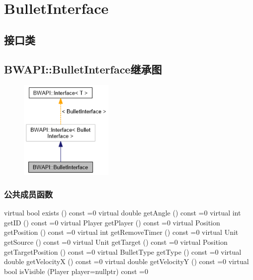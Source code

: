 \tableofcontents
\section{BulletInterface}
\subsection{接口类}
\subsection{BWAPI::BulletInterface继承图}
\begin{figure}[H]
    \centering
    \includegraphics[width=0.4\textwidth]{figures/BulletInterface继承图.png}
\end{figure}
\subsubsection{公共成员函数}
\begin{codebox}[公共成员函数]
virtual bool exists () const =0
virtual double getAngle () const =0
virtual int getID () const =0
virtual Player getPlayer () const =0
virtual Position getPosition () const =0
virtual int getRemoveTimer () const =0
virtual Unit getSource () const =0
virtual Unit getTarget () const =0
virtual Position getTargetPosition () const =0
virtual BulletType getType () const =0
virtual double getVelocityX () const =0
virtual double getVelocityY () const =0
virtual bool isVisible (Player player=nullptr) const =0
\end{codebox}
